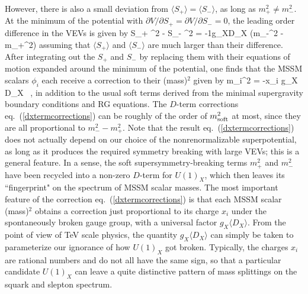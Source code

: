 However, there is also a small deviation from $\langle S_+\rangle =
\langle S_- \rangle$, as long
as $m_+^2 \not= m_-^2$. At the minimum of the potential
with $\partial V/\partial S_+ = \partial V/\partial S_- = 0$,
the leading order difference in the VEVs is given by
\beq
 \langle S_+ \rangle^2 - \langle S_- \rangle^2 =
-{1\over g_X}\langle D_X \rangle {}(m_-^2 - m_+^2)
\eeq
assuming that
$\langle S_+ \rangle$ and $\langle S_- \rangle$ are much larger
than their difference. After integrating out
the $S_+$ and $S_-$ by replacing them
with their equations of motion expanded around the minimum of the
potential, one finds that the MSSM scalars
$\phi_i$ each
receive a correction to their (mass)$^2$ given by
\beq
\Delta m_i^2 =  -x_i g_X \langle D_X \rangle\, ,
\label{dxtermcorrections}
\eeq
in addition to the usual soft terms derived from the minimal supergravity
boundary conditions and RG equations.
The $D$-term corrections eq.~(\ref{dxtermcorrections}) can be roughly of
the order of $m_{\rm soft}^2$
at most, since they are all proportional to $m_-^2- m_+^2$.
Note that the result eq.~(\ref{dxtermcorrections}) does not actually
depend on our choice of
the nonrenormalizable superpotential, 
as long as  it produces the required symmetry
breaking with large VEVs; this is a general feature. In a
sense, the soft supersymmetry-breaking terms $m_+^2$ and $m_-^2$
have been recycled into a non-zero $D$-term for $U(1)_X$,
which then leaves its ``fingerprint" on the spectrum of MSSM scalar
masses.
The most important feature of the correction eq.~(\ref{dxtermcorrections})
is that each MSSM scalar (mass)$^2$ obtains a correction just
proportional to its charge $x_i$ under the spontaneously broken
gauge group, with a universal factor $g_X \langle D_X \rangle$. From
the
point of view of TeV scale physics, the quantity
$g_X \langle D_X \rangle$ can simply be taken to parameterize
our ignorance of how $U(1)_X$ got broken.
Typically, the charges $x_i$ are rational numbers
and do not all have the same sign, so that a particular candidate
$U(1)_X$ can leave a quite distinctive pattern of mass splittings
on the squark and slepton spectrum.


